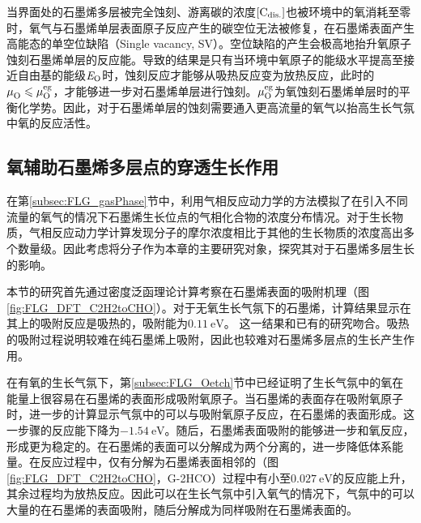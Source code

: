 当界面处的石墨烯多层被完全蚀刻、游离碳的浓度$\rm{\left[C_{dis.}\right]} \it$也被环境中的氧消耗至零时，氧气与石墨烯单层表面原子反应产生的碳空位无法被修复，在石墨烯表面产生高能态的单空位缺陷（Single vacancy, SV）。空位缺陷的产生会极高地抬升氧原子蚀刻石墨烯单层的反应能。导致的结果是只有当环境中氧原子的能级水平提高至接近自由基的能级$\it E_{\rm O} \it$时，蚀刻反应才能够从吸热反应变为放热反应，此时的$\it \mu_{\rm O}^{\rm } \it \leqslant  \it \mu_{\rm O}^{\rm eg} \it  $，才能够进一步对石墨烯单层进行蚀刻。$\it \mu_{\rm O}^{\rm eg} \it$为氧蚀刻石墨烯单层时的平衡化学势。因此，对于石墨烯单层的蚀刻需要通入更高流量的氧气以抬高生长气氛中氧的反应活性。

\subsection{氧辅助石墨烯多层点的穿透生长作用}
\label{subsec:Opene}
在第\ref{subsec:FLG_gasPhase}节中，利用气相反应动力学的方法模拟了在引入不同流量的氧气的情况下石墨烯生长位点的气相化合物的浓度分布情况。对于生长物质，气相反应动力学计算发现分子的摩尔浓度相比于其他的生长物质的浓度高出多个数量级。因此考虑将分子作为本章的主要研究对象，探究其对于石墨烯多层生长的影响。

本节的研究首先通过密度泛函理论计算考察在石墨烯表面的吸附机理（图\ref{fig:FLG_DFT_C2H2toCHO}）。对于无氧生长气氛下的石墨烯，计算结果显示在其上的吸附反应是吸热的，吸附能为$\SI{0.11}{\electronvolt}$。
这一结果和已有的研究吻合。吸热的吸附过程说明较难在纯石墨烯上吸附，因此也较难对石墨烯多层点的生长产生作用。

在有氧的生长气氛下，第\ref{subsec:FLG_Oetch}节中已经证明了生长气氛中的氧在能量上很容易在石墨烯的表面形成吸附氧原子。当石墨烯的表面存在吸附氧原子时，进一步的计算显示气氛中的可以与吸附氧原子反应，在石墨烯的表面形成。这一步骤的反应能下降为$\SI{-1.54}{\electronvolt}$。随后，石墨烯表面吸附的能够进一步和氧反应，形成更为稳定的。在石墨烯的表面可以分解成为两个分离的，进一步降低体系能量。在反应过程中，仅有分解为石墨烯表面相邻的（图\ref{fig:FLG_DFT_C2H2toCHO}，G-2HCO）过程中有小至$\SI{0.027}{\electronvolt}$的反应能上升，其余过程均为放热反应。因此可以在生长气氛中引入氧气的情况下，气氛中的可以大量的在石墨烯的表面吸附，随后分解成为同样吸附在石墨烯表面的。

